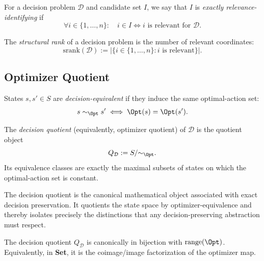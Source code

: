 \begin{definition}\label{def:exact-identifiability}
For a decision problem $\mathcal{D}$ and candidate set $I$, we say that $I$ is \emph{exactly relevance-identifying} if
\[
\forall i \in \{1,\ldots,n\}:\quad i \in I \iff i \text{ is relevant for } \mathcal{D}.
\]
\end{definition}

\begin{definition}\label{def:srank}
The \emph{structural rank} of a decision problem is the number of relevant coordinates:
\[
\mathrm{srank}(\mathcal{D}) := \left|\{i \in \{1,\ldots,n\}: i \text{ is relevant}\}\right|.
\]
\end{definition}

\subsection{Optimizer Quotient}

\begin{definition}\label{def:decision-equiv}
States $s,s' \in S$ are \emph{decision-equivalent} if they induce the same optimal-action set:
\[
s \sim_{\Opt} s' \iff \Opt(s)=\Opt(s').
\]
\end{definition}

\begin{definition}\label{def:decision-quotient}
The \emph{decision quotient} (equivalently, optimizer quotient) of $\mathcal{D}$ is the quotient object
\[
Q_{\mathcal{D}} := S / {\sim_{\Opt}}.
\]
Its equivalence classes are exactly the maximal subsets of states on which the optimal-action set is constant.
\end{definition}

The decision quotient is the canonical mathematical object associated with exact decision preservation. It quotients the state space by optimizer-equivalence and thereby isolates precisely the distinctions that any decision-preserving abstraction must respect.

\begin{proposition}\label{prop:optimizer-coimage}
The decision quotient $Q_{\mathcal{D}}$ is canonically in bijection with $\operatorname{range}(\Opt)$. Equivalently, in \textbf{Set}, it is the coimage/image factorization of the optimizer map.
\end{proposition}


